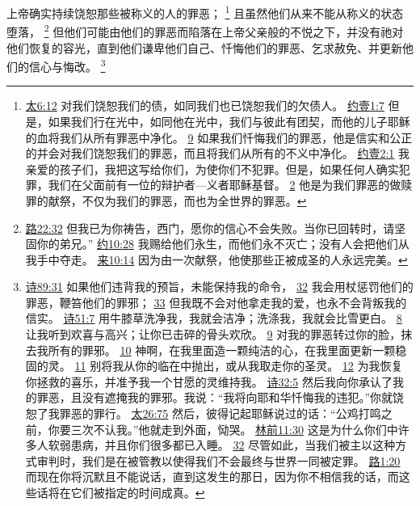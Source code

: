 \documentclass[12pt, a4paper, oneside]{ctexart}
\newcounter{parnum}[section]
\newcommand{\N}{%
   \noindent\refstepcounter{parnum}%
    \makebox[\parindent][l]{\textbf{\arabic{parnum}.}}}
\begin{document}
\N 上帝确实持续饶恕那些被称义的人的罪恶；
	\footnote {
		\href{https://biblehub.com/matthew/6-12.htm}{太6:12} 对我们饶恕我们的债，如同我们也已饶恕我们的欠债人。
		\href{https://biblehub.com/1_john/1-7.htm}{约壹1:7} 但是，如果我们行在光中，如同他在光中，我们与彼此有团契，而他的儿子耶稣的血将我们从所有罪恶中净化。
		\href{https://biblehub.com/1_john/1-9.htm}{9} 如果我们忏悔我们的罪恶，他是信实和公正的并会对我们饶恕我们的罪恶，而且将我们从所有的不义中净化。
		\href{https://biblehub.com/1_john/2-1.htm}{约壹2:1} 我亲爱的孩子们，我把这写给你们，为使你们不犯罪。但是，如果任何人确实犯罪，我们在父面前有一位的辩护者---义者耶稣基督。
		\href{https://biblehub.com/1_john/2-2.htm}{2} 他是为我们罪恶的做赎罪的献祭，不仅为我们的罪恶，而也为全世界的罪恶。
	}
	且虽然他们从来不能从称义的状态堕落，
	\footnote {
		\href{https://biblehub.com/luke/22-32.htm}{路22:32} 但我已为你祷告，西门，愿你的信心不会失败。当你已回转时，请坚固你的弟兄。”
		\href{https://biblehub.com/john/10-28.htm}{约10:28} 我赐给他们永生，而他们永不灭亡；没有人会把他们从我手中夺走。
		\href{https://biblehub.com/hebrews/10-14.htm}{来10:14} 因为由一次献祭，他使那些正被成圣的人永远完美。
	}
	但他们可能由他们的罪恶而陷落在上帝父亲般的不悦之下，并没有祂对他们恢复的容光，直到他们谦卑他们自己、忏悔他们的罪恶、乞求赦免、并更新他们的信心与悔改。
	\footnote {
		\href{https://biblehub.com/psalms/89-31.htm}{诗89:31} 如果他们违背我的预旨，未能保持我的命令，
		\href{https://biblehub.com/psalms/89-32.htm}{32} 我会用杖惩罚他们的罪恶，鞭笞他们的罪邪；
		\href{https://biblehub.com/psalms/89-33.htm}{33} 但我既不会对他拿走我的爱，也永不会背叛我的信实。
		\href{https://biblehub.com/psalms/51-7.htm}{诗51:7} 用牛膝草洗净我，我就会洁净；洗涤我，我就会比雪更白。
		\href{https://biblehub.com/psalms/51-8.htm}{8} 让我听到欢喜与高兴；让你已击碎的骨头欢欣。
		\href{https://biblehub.com/psalms/51-9.htm}{9} 对我的罪恶转过你的脸，抹去我所有的罪邪。
		\href{https://biblehub.com/psalms/51-10.htm}{10} 神啊，在我里面造一颗纯洁的心，在我里面更新一颗稳固的灵。
		\href{https://biblehub.com/psalms/51-11.htm}{11} 别将我从你的临在中抛出，或从我取走你的圣灵。
		\href{https://biblehub.com/psalms/51-12.htm}{12} 为我恢复你拯救的喜乐，并准予我一个甘愿的灵维持我。
		\href{https://biblehub.com/psalms/32-5.htm}{诗32:5} 然后我向你承认了我的罪恶，且没有遮掩我的罪邪。我说：“我将向耶和华忏悔我的违犯。”你就饶恕了我罪恶的罪行。
		\href{https://biblehub.com/matthew/26-75.htm}{太26:75} 然后，彼得记起耶稣说过的话：“公鸡打鸣之前，你要三次不认我。”他就走到外面，恸哭。
		\href{https://biblehub.com/1_corinthians/11-30.htm}{林前11:30} 这是为什么你们中许多人软弱患病，并且你们很多都已入睡。
		\href{https://biblehub.com/1_corinthians/11-32.htm}{32} 尽管如此，当我们被主以这种方式审判时，我们是在被管教以使得我们不会最终与世界一同被定罪。
		\href{https://biblehub.com/luke/1-20.htm}{路1:20} 而现在你将沉默且不能说话，直到这发生的那日，因为你不相信我的话，而这些话将在它们被指定的时间成真。
	}
\end{document}
